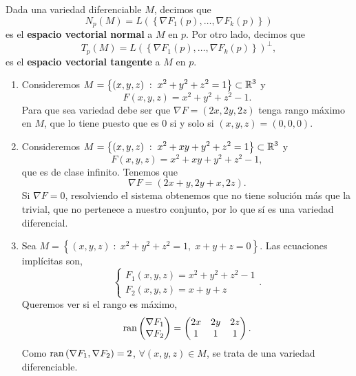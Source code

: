 \begin{definition}
	Dada una variedad diferenciable $\displaystyle M $,
	decimos que 
	\[N_{p}\left(M\right) = L\left( \left\{ \nabla F_{1}\left(p\right), \ldots, \nabla F_{k}\left(p\right)\right\} \right) \]
	es el \textbf{espacio vectorial normal} a $\displaystyle M $ en $\displaystyle p $. Por otro lado, decimos que 
	\[T_{p}\left(M\right) = L\left( \left\{ \nabla F_{1}\left(p\right), \ldots, \nabla F_{k}\left(p\right)\right\} \right)^{\perp} ,\]
	es el \textbf{espacio vectorial tangente} a $\displaystyle M $ en $\displaystyle p $. 
\end{definition}
\begin{eg}
\begin{enumerate}
	\item Consideremos $\displaystyle M = \left\{ \left(x,y,z\right) \; : \; x^{2}+y^{2}+z^{2} = 1\right\} \subset \mathbb{R}^{3} $ y 
		\[F\left(x,y,z\right) = x^{2}+y^{2}+z^{2}-1 .\]
Para que sea variedad debe ser que $\displaystyle \nabla F = \left(2x, 2y, 2z\right) $ tenga rango máximo en $\displaystyle M $, que lo tiene puesto que es 0 si y solo si $\displaystyle \left(x,y,z\right)=\left(0,0,0\right) $. 
\item Consideremos $\displaystyle M = \left\{ \left(x,y,z\right) \;  :\; x^{2}+xy+y^{2}+z^{2} = 1\right\} \subset \mathbb{R}^{3} $ y 
	\[F\left(x,y,z\right)=x^{2}+xy+y^{2}+z^{2}-1 ,\]
	que es de clase infinito. Tenemos que 
	\[\nabla F = \left(2x+y, 2y+x, 2z\right) .\]
	Si $\displaystyle \nabla F = 0 $, resolviendo el sistema obtenemos que no tiene solución más que la trivial, que no pertenece a nuestro conjunto, por lo que sí es una variedad diferencial. 
\item Sea $\displaystyle M = \left\{ \left(x,y,z\right) \; : \; x^{2}+y^{2}+z^{2} = 1 , \; x + y +z = 0\right\}  $. Las ecuaciones implícitas son,
\[
\begin{cases}
F_{1}\left(x,y,z\right)=x^{2}+y^{2}+z^{2}-1\\
F_{2}\left(x,y,z\right)=x+y+z
\end{cases}
.\]
Queremos ver si el rango es máximo,
\[\operatorname{ran}\begin{pmatrix} \nabla F_{1} \\ \nabla F_{2} \end{pmatrix} = \begin{pmatrix} 2x & 2y & 2z \\ 1 & 1 & 1 \end{pmatrix} .\]
Como $\displaystyle \operatorname{ran}\left(\nabla F_{1}, \nabla F_{2}\right)=2 $, $\displaystyle \forall \left(x,y,z\right)\in M $, se trata de una variedad diferenciable.	
\end{enumerate}
\end{eg}
